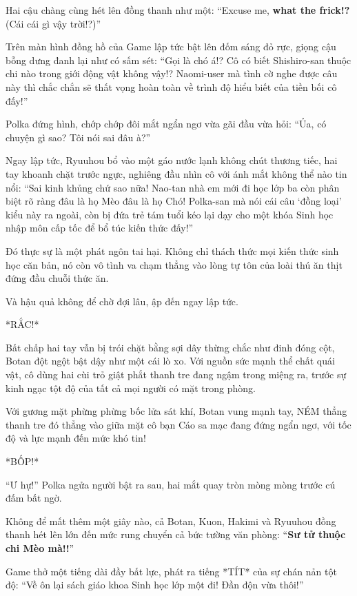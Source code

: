 \documentclass[../main.tex]{subfiles}
\begin{document}
Hai cậu chàng cùng hét lên đồng thanh như một: ``Excuse me, \textbf{what the frick!?} (Cái cái gì vậy trời!?)''

Trên màn hình đồng hồ của Game lập tức bật lên đốm sáng đỏ rực, giọng cậu bỗng dưng đanh lại như có sấm sét: ``Gọi là chó á!? Cô có biết Shishiro-san thuộc chi nào trong giới động vật không vậy!? Naomi-user mà tình cờ nghe được câu này thì chắc chắn sẽ thất vọng hoàn toàn về trình độ hiểu biết của tiền bối cô đấy!''

Polka đứng hình, chớp chớp đôi mắt ngẩn ngơ vừa gãi đầu vừa hỏi: ``Ủa, có chuyện gì sao? Tôi nói sai đâu à?''

Ngay lập tức, Ryuuhou bổ vào một gáo nước lạnh không chút thương tiếc, hai tay khoanh chặt trước ngực, nghiêng đầu nhìn cô với ánh mắt không thể nào tin nổi: ``Sai kinh khủng chứ sao nữa! Nao-tan nhà em mới đi học lớp ba còn phân biệt rõ ràng đâu là họ Mèo đâu là họ Chó! Polka-san mà nói cái câu `đồng loại' kiểu này ra ngoài, còn bị đứa trẻ tám tuổi kéo lại dạy cho một khóa Sinh học nhập môn cấp tốc để bổ túc kiến thức đấy!''

Đó thực sự là một phát ngôn tai hại. Không chỉ thách thức mọi kiến thức sinh học căn bản, nó còn vô tình va chạm thẳng vào lòng tự tôn của loài thú ăn thịt đứng đầu chuỗi thức ăn.

Và hậu quả không để chờ đợi lâu, ập đến ngay lập tức.

*RẮC!*

Bất chấp hai tay vẫn bị trói chặt bằng sợi dây thừng chắc như đinh đóng cột, Botan đột ngột bật dậy như một cái lò xo. Với nguồn sức mạnh thể chất quái vật, cô dùng hai cùi trỏ giật phắt thanh tre đang ngậm trong miệng ra, trước sự kinh ngạc tột độ của tất cả mọi người có mặt trong phòng.

Với gương mặt phừng phừng bốc lửa sát khí, Botan vung mạnh tay, NÉM thẳng thanh tre đó thẳng vào giữa mặt cô bạn Cáo sa mạc đang đứng ngẩn ngơ, với tốc độ và lực mạnh đến mức khó tin!

*BỐP!*

``Ư hự!'' Polka ngửa người bật ra sau, hai mắt quay tròn mòng mòng trước cú đấm bất ngờ.


Không để mất thêm một giây nào, cả Botan, Kuon, Hakimi và Ryuuhou đồng thanh hét lên lớn đến mức rung chuyển cả bức tường văn phòng: ``\textbf{Sư tử thuộc chi Mèo mà!!}''

Game thở một tiếng dài đầy bất lực, phát ra tiếng *TÍT* của sự chán nản tột độ: ``Về ôn lại sách giáo khoa Sinh học lớp một đi! Đần độn vừa thôi!''
\end{document}
